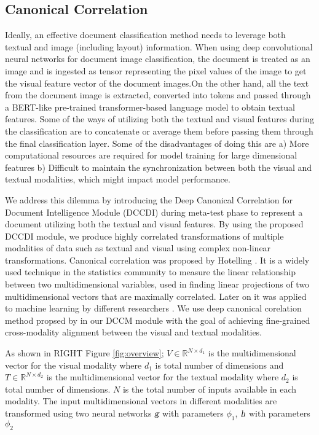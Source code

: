 \subsection{Canonical Correlation}\label{tab:canonicalCorelation}
Ideally, an effective document classification method needs to leverage both textual and image (including layout) information. When using deep convolutional neural networks for document image classification, the document is treated as an image and is ingested as tensor representing the pixel values of the image to get the visual feature vector of the document images.On the other hand, all the text from the document image is extracted, converted into tokens and passed through a BERT-like pre-trained transformer-based language model to obtain textual features. Some of the ways of utilizing both the textual and visual features during the classification are to concatenate or average them before passing them through the final classification layer. Some of the disadvantages of doing this are a) More computational resources are required for model training for large dimensional features b) Difficult to maintain the synchronization between both the visual and textual modalities, which might impact model performance.

We address this dilemma by introducing the Deep Canonical Correlation for Document Intelligence Module (DCCDI) during meta-test phase to represent a document utilizing both the textual and visual features. By using the proposed DCCDI module, we produce highly correlated transformations of multiple modalities of data such as textual and visual using complex non-linear transformations. Canonical correlation was proposed by Hotelling   \citep{hotelling1992relations}. It is a widely used technique in the statistics community to measure the linear relationship between two multidimensional variables, used in finding linear projections of two multidimensional vectors that are maximally correlated. Later on it was applied to machine learning by different researchers \citep{akaho2006kernel, melzer2001nonlinear,bach2002kernel,andrew2013deep}. We use deep canonical corelation method propsed by \citep{andrew2013deep} in our DCCM module with the goal of achieving fine-grained cross-modality alignment between the visual and textual modalities. 

As shown in RIGHT Figure \ref{fig:overview}; $V \in \mathbb{R}^{N \times d_{1}}$ is the multidimensional vector for the visual modality where $d_{1}$ is total number of dimensions and $T \in \mathbb{R}^{N \times d_{2}}$ is the multidimensional vector for the textual modality where $d_{2}$ is total number of dimensions. $N$ is the total number of inputs available in each modality. The input multidimensional vectors in different modalities are transformed using two neural networks $\textsl{g}$ with parameters $\phi_{1}$, $\textsl{h}$ with parameters $\phi_{2}$


